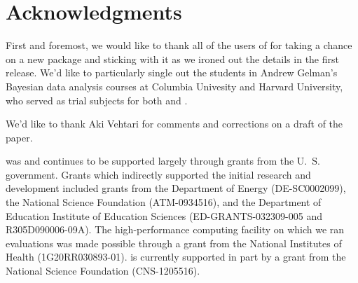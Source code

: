 \documentclass[article]{jss}
\begin{document}






\section*{Acknowledgments}

First and foremost, we would like to thank all of the users of
 for taking a chance on a new package and sticking with
it as we ironed out the details in the first release.  We'd like to
particularly single out the students in Andrew Gelman's Bayesian data
analysis courses at Columbia Univesity and Harvard University, who
served as trial subjects for both  and \citep{GelmanEtAl:2013}.

We'd like to thank Aki Vehtari for comments and corrections on a draft
of the paper.

 was and continues to be supported largely through grants from the
U.~S. government.  Grants which indirectly supported the initial
research and development included grants from the Department of Energy
(DE-SC0002099), the National Science Foundation (ATM-0934516), and the
Department of Education Institute of Education Sciences
(ED-GRANTS-032309-005 and R305D090006-09A).  The high-performance
computing facility on which we ran evaluations was made possible
through a grant from the National Institutes of Health
(1G20RR030893-01).   is currently supported in part by a grant
from the National Science Foundation (CNS-1205516).
\end{document}
